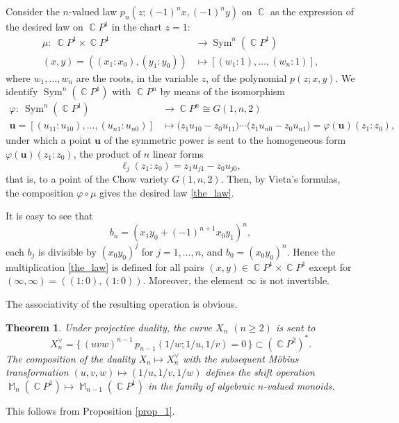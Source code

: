 \documentclass[14pt, dvipsnames]{extarticle}
\makeatletter
\theoremstyle{plain}
\newtheorem{theorem}{Theorem}
\theoremstyle{definition}
\theoremstyle{remark}
\renewenvironment{proof}[1][\proofname]{
  \par\pushQED{\qed}\normalfont
  \topsep6\p@\@plus6\p@\relax
  \trivlist\item[\hskip\labelsep\bfseries\itshape #1\@addpunct{.}]
}{\popQED\endtrivlist\@endpefalse}
\let\phi\varphi
\DeclareMathOperator{\Sym}{\mathrm{Sym}}
\DeclareMathOperator{\Cc}{\mathbb{C}}
\DeclareMathOperator{\M}{\mathbb{M}}
\makeatother
\begin{document}
\begin{proof}
Consider the $n$-valued law $p_n(z;(-1)^n x,(-1)^n y)$ on $\Cc$ as the expression of the desired law on $\Cc\!P^1$ in the chart $z=1$:
\[
\begin{aligned}
\mu:\ \Cc\!P^1\times \Cc\!P^1&\to \Sym^n(\Cc\!P^1)\\
(x,y)=((x_1:x_0),(y_1:y_0))&\mapsto [(w_1:1),\dots,(w_n:1)],
\end{aligned}
\]
where $w_1,\dots,w_n$ are the roots, in the variable $z$, of the polynomial $p(z;x,y)$. We identify $\Sym^n(\Cc\!P^1)$ with $\Cc\!P^n$ by means of the isomorphism
\begin{align}\label{identification}
\phi:\ \Sym^n(\Cc\!P^1)&\longrightarrow \Cc\!P^n\cong G(1,n,2)\\
\nonumber
\bm{u}=[(u_{11}\!:\!u_{10}),\dots,(u_{n1}\!:\!u_{n0})]&\longmapsto
\bigl(z_1u_{10}-z_0u_{11}\bigr)\cdots \bigl(z_1u_{n0}-z_0u_{n1}\bigr)=\phi(\bm{u})(z_1:z_0),
\end{align}
under which a point $\bm{u}$ of the symmetric power is sent to the homogeneous form $\phi(\bm{u})(z_1:z_0)$, the product of $n$ linear forms
$$\ell_j(z_1:z_0)=z_1u_{j1}-z_0u_{j0},$$
that is, to a point of the Chow variety $G(1,n,2)$. Then, by Vieta's formulas, the composition $\phi\circ \mu$ gives the desired law \eqref{the_law}.

It is easy to see that
$$b_n=(x_1y_0+(-1)^{n+1}x_0y_1)^n,$$
each $b_j$ is divisible by $(x_0y_0)^j$ for $j=1,\dots,n$, and $b_0=(x_0y_0)^n$. Hence the multiplication \eqref{the_law} is defined for all pairs $(x,y)\in \Cc\!P^1\times \Cc\!P^1$ except for $(\infty,\infty)=((1:0),(1:0))$. Moreover, the element $\infty$ is not invertible.

The associativity of the resulting operation is obvious.
\end{proof}

\begin{theorem}\label{shift_duality_monoids}
Under projective duality, the curve $X_n$ $(n\ge 2)$ is sent to
\[
X_n^\vee=\{\, (uvw)^{n-1}\, p_{n-1}(1/w;1/u,1/v)=0\,\}\subset (\Cc\!P^2)^{\ast}.
\]
The composition of the duality $X_n\mapsto X_n^\vee$ with the subsequent Möbius transformation $(u,v,w)\mapsto (1/u,1/v,1/w)$ defines the shift operation $\M_n(\Cc\!P^1)\mapsto \M_{n-1}(\Cc\!P^1)$ in the family of algebraic $n$-valued monoids.
\end{theorem}

\begin{proof}
This follows from Proposition \ref{prop_1}.
\end{proof}
\end{document}
